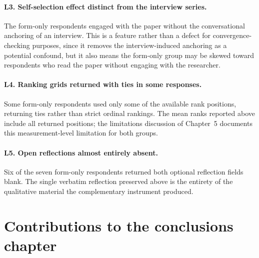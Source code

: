 \paragraph*{L3. Self-selection effect distinct from the interview series.} The form-only respondents engaged with the paper without the conversational anchoring of an interview. This is a feature rather than a defect for convergence-checking purposes, since it removes the interview-induced anchoring as a potential confound, but it also means the form-only group may be skewed toward respondents who read the paper without engaging with the researcher.

\paragraph*{L4. Ranking grids returned with ties in some responses.} Some form-only respondents used only some of the available rank positions, returning ties rather than strict ordinal rankings. The mean ranks reported above include all returned positions; the limitations discussion of Chapter~5 documents this measurement-level limitation for both groups.

\paragraph*{L5. Open reflections almost entirely absent.} Six of the seven form-only respondents returned both optional reflection fields blank. The single verbatim reflection preserved above is the entirety of the qualitative material the complementary instrument produced.

\section*{Contributions to the conclusions chapter}

